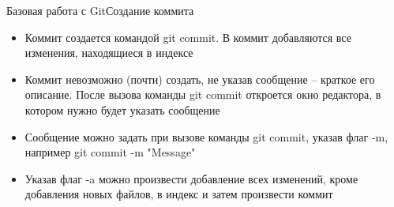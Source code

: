 \begin{frame}{Базовая работа с Git}{Создание коммита}
    \begin{itemize}
        \item
              Коммит создается командой git commit. В коммит добавляются все изменения, находящиеся в индексе
        \item
              Коммит невозможно (почти) создать, не указав сообщение -- краткое его описание. После вызова команды git commit откроется окно редактора, в котором нужно будет указать сообщение
        \item
              Сообщение можно задать при вызове команды git commit, указав флаг -m, например git commit -m "Message"
        \item
              Указав флаг -a можно произвести добавление всех изменений, кроме добавления новых файлов, в индекс и затем произвести коммит
    \end{itemize}
\end{frame}